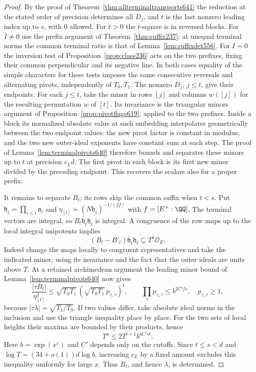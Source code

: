 \documentclass[a4paper,11pt]{article}
\theoremstyle{definition}
\theoremstyle{remark}
\numberwithin{equation}{section}
\begin{document}
\begin{proof}
By the proof of Theorem~\ref{thm:allterminaltransports641}
the reduction at the stated order of precision determines all
\(D_j\), and \(t\) is the last nonzero leading index up to \(s\),
with \(0\) allowed. For \(t>0\) the \(t\)-square is in reversed
blocks. For \(I\ne0\) use the prefix argument of
Theorem~\ref{thm:suffix237}; at unequal terminal norms the
common terminal ratio is that of Lemma~\ref{lem:suffixdet556}.
For \(I=0\) the inversion test of Proposition~\ref{prop:class236}
acts on the two prefixes, fixing their common perpendicular
and its negative line. In both cases equality of the simple
characters for these tests imposes the same consecutive
reversals and alternating pivots, independently of \(T_0,T_1\).
The nonzero \(D_j\), \(j\le t\), give their endpoints.
For each \(j\le t\), take the minor in rows \([j]\) and
columns \(w([j])\) for the resulting permutation \(w\)
of \([t]\). Its invariance is the triangular minors argument
of Proposition~\ref{prop:pivotflags619}, applied to the two
prefixes. Inside a block its normalized absolute value at
each embedding interpolates geometrically between the two
endpoint values: the new pivot factor is constant in modulus,
and the two new outer-ideal exponents have constant sum at
each step. The proof of Lemma~\ref{lem:terminalpivots640}
therefore bounds and separates these minors up to \(t\)
at precision \(c_Ld\). The first pivot in each block is its
first new minor divided by the preceding endpoint. This
recovers the scalars also for a proper prefix.

It remains to separate \(B_t\); its rows skip the common
suffix when \(t<s\). Put \(\mathfrak h_t=\prod_{i\le t}
\mathfrak a_i\) and \(\eta_{[t]}=(N\mathfrak h_t)^{-1/(2f)}\)
with \(f=[E^+:\QQ]\). The terminal vectors are integral, so
\(B_t\bar{\mathfrak h}_t\mathfrak h_t\) is integral. A
congruence of the row maps up to the local integral unipotents
implies
\[
 (B_t-B'_t)\bar{\mathfrak h}_t\mathfrak h_t
                                  \subseteq T^a\mathcal O_E .
\]
Indeed change the maps locally to congruent representatives
and take the indicated minor, using its invariance and the
fact that the outer ideals are units above \(T\).
At a retained archimedean argument the leading minor bound
of Lemma~\ref{lem:terminalpivots640} now gives
\[
 \frac{|\tau B_t|}{\eta_{[t]}^2}
 \le \sqrt{T_0T_1}\,
       (\sqrt{T_0T_1}\,p_{\gamma,\tau})^t,\qquad
 \prod_\tau p_{\gamma,\tau}\le b^{2C'fs},\quad
 p_{\gamma,\tau}\ge1 ,
\]
because \(|\tau\lambda|=\sqrt{T_1/T_0}\).
If two values differ, take absolute ideal norms in the
inclusion and use the triangle inequality place by place.
For the two sets of local heights their maxima are bounded
by their products, hence
\[
                     T^a\le2T^{t+1}b^{4C'st}.
\]
Here \(b=\exp(x^\varepsilon)\) and \(C'\) depends only on
the cutoffs. Since \(t\le s<d\) and
\(\log T=(34+o(1))d\log b\), increasing \(c_L\) by a fixed
amount excludes this inequality uniformly for large \(x\).
Thus \(B_t\), and hence \(\lambda\), is determined.
\end{proof}
\end{document}
